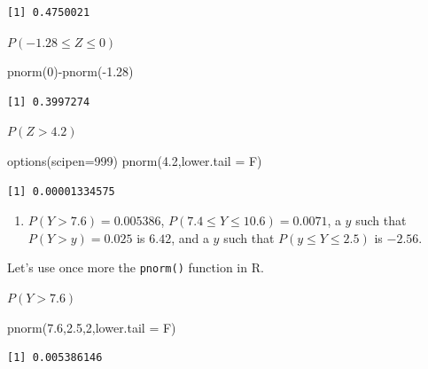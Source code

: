 \documentclass[
  letterpaper,
  DIV=11,
  numbers=noendperiod]{scrreprt}
\newenvironment{Shaded}{\begin{snugshade}}{\end{snugshade}}
\newcommand{\AttributeTok}[1]{\textcolor[rgb]{0.40,0.45,0.13}{#1}}
\newcommand{\DecValTok}[1]{\textcolor[rgb]{0.68,0.00,0.00}{#1}}
\newcommand{\FloatTok}[1]{\textcolor[rgb]{0.68,0.00,0.00}{#1}}
\newcommand{\FunctionTok}[1]{\textcolor[rgb]{0.28,0.35,0.67}{#1}}
\newcommand{\NormalTok}[1]{\textcolor[rgb]{0.00,0.23,0.31}{#1}}
\newcommand{\SpecialCharTok}[1]{\textcolor[rgb]{0.37,0.37,0.37}{#1}}
\providecommand{\tightlist}{%
  \setlength{\itemsep}{0pt}\setlength{\parskip}{0pt}}\usepackage{longtable,booktabs,array}
\begin{document}
\begin{verbatim}
[1] 0.4750021
\end{verbatim}

\(P(-1.28 \leq Z \leq 0)\)

\begin{Shaded}
\begin{Highlighting}[numbers=left,,]
\FunctionTok{pnorm}\NormalTok{(}\DecValTok{0}\NormalTok{)}\SpecialCharTok{{-}}\FunctionTok{pnorm}\NormalTok{(}\SpecialCharTok{{-}}\FloatTok{1.28}\NormalTok{)}
\end{Highlighting}
\end{Shaded}

\begin{verbatim}
[1] 0.3997274
\end{verbatim}

\(P(Z > 4.2)\)

\begin{Shaded}
\begin{Highlighting}[numbers=left,,]
\FunctionTok{options}\NormalTok{(}\AttributeTok{scipen=}\DecValTok{999}\NormalTok{)}
\FunctionTok{pnorm}\NormalTok{(}\FloatTok{4.2}\NormalTok{,}\AttributeTok{lower.tail =}\NormalTok{ F)}
\end{Highlighting}
\end{Shaded}

\begin{verbatim}
[1] 0.00001334575
\end{verbatim}

\begin{enumerate}
\def\labelenumi{\arabic{enumi}.}
\setcounter{enumi}{1}
\tightlist
\item
  \(P(Y>7.6)=0.005386\), \(P(7.4 \leq Y \leq 10.6)=0.0071\), a \(y\)
  such that \(P(Y>y)=0.025\) is \(6.42\), and a \(y\) such that
  \(P(y \leq Y \leq 2.5)\) is \(-2.56\).
\end{enumerate}

Let's use once more the \texttt{pnorm()} function in R.

\(P(Y>7.6)\)

\begin{Shaded}
\begin{Highlighting}[numbers=left,,]
\FunctionTok{pnorm}\NormalTok{(}\FloatTok{7.6}\NormalTok{,}\FloatTok{2.5}\NormalTok{,}\DecValTok{2}\NormalTok{,}\AttributeTok{lower.tail =}\NormalTok{ F)}
\end{Highlighting}
\end{Shaded}

\begin{verbatim}
[1] 0.005386146
\end{verbatim}
\end{document}
